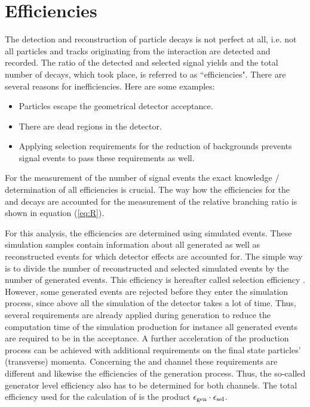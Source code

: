 \chapter{Efficiencies}
\label{sec:Efficiencies}

The detection and reconstruction of particle decays is not perfect at all, i.e. not all particles and tracks originating from the \proton\proton interaction are detected and recorded.
The ratio of the detected and selected signal yields and the total number of decays, which took place, is referred to as ``efficiencies".
There are several reasons for inefficiencies.
Here are some examples:
\begin{itemize}
    \item Particles escape the geometrical detector acceptance.
    \item There are dead regions in the detector.
    \item Applying selection requirements for the reduction of backgrounds prevents signal events to pass these requirements as well.
\end{itemize}
For the measurement of the number of signal events the exact knowledge / determination of all efficiencies is crucial.
The way how the efficiencies for the \LbToDpmunuX and \LbToLcmunu decays are accounted for the measurement of the relative branching ratio \R is shown in equation (\ref{eq:R}).

For this analysis, the efficiencies are determined using simulated events.
These simulation samples contain information about all generated as well as reconstructed events for which detector effects are accounted for.
The simple way is to divide the number of reconstructed and selected simulated events by the number of generated events. 
This efficiency is hereafter called selection efficiency \effSel.
However, some generated events are rejected before they enter the simulation process, since above all the simulation of the detector takes a lot of time. 
Thus, several requirements are already applied during generation to reduce the computation time of the simulation production for instance all generated events are required to be in the \lhcb acceptance.
A further acceleration of the production process can be achieved with additional requirements on the final state particles' (transverse) momenta.
Concerning the \LbToDpmunuX and \LbToLcmunu channel these requirements are different and likewise the efficiencies of the generation process.
Thus, the so-called generator level efficiency \effGen also has to be determined for both channels. 
The total efficiency used for the calculation of \R is the product $\epsilon_{\text{gen}} \cdot \epsilon_{\text{sel}}$.

